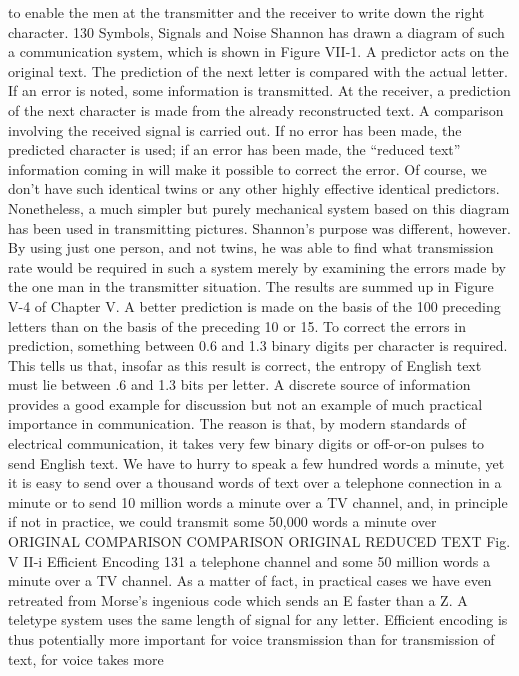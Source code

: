 {{{to enable the men at the transmitter and the receiver to
write down the right character.
130 Symbols, Signals and Noise
Shannon has drawn a diagram of such a communication system,
which is shown in Figure VII-1. A predictor acts on the original
text. The prediction of the next letter is compared with the actual
letter. If an error is noted, some information is transmitted. At the
receiver, a prediction of the next character is made from the already
reconstructed text. A comparison involving the received signal is
carried out. If no error has been made, the predicted character is
used; if an error has been made, the “reduced text” information
coming in will make it possible to correct the error.
Of course, we don’t have such identical twins or any other highly
effective identical predictors. Nonetheless, a much simpler but
purely mechanical system based on this diagram has been used in
transmitting pictures. Shannon’s purpose was different, however.
By using just one person, and not twins, he was able to find what
transmission rate would be required in such a system merely by
examining the errors made by the one man in the transmitter
situation. The results are summed up in Figure V-4 of Chapter V.
A better prediction is made on the basis of the 100 preceding
letters than on the basis of the preceding 10 or 15. To correct the
errors in prediction, something between 0.6 and 1.3 binary digits
per character is required. This tells us that, insofar as this result
is correct, the entropy of English text must lie between .6 and 1.3
bits per letter.
A discrete source of information provides a good example for
discussion but not an example of much practical importance in
communication. The reason is that, by modern standards of electrical
communication, it takes very few binary digits or off-or-on
pulses to send English text. We have to hurry to speak a few
hundred words a minute, yet it is easy to send over a thousand
words of text over a telephone connection in a minute or to send
10 million words a minute over a TV channel, and, in principle if
not in practice, we could transmit some 50,000 words a minute over
ORIGINAL COMPARISON COMPARISON ORIGINAL
REDUCED TEXT
Fig. V II-i
Efficient Encoding 131
a telephone channel and some 50 million words a minute over a
TV channel. As a matter of fact, in practical cases we have even
retreated from Morse’s ingenious code which sends an E faster than
a Z. A teletype system uses the same length of signal for any letter.
Efficient encoding is thus potentially more important for voice
transmission than for transmission of text, for voice takes more
}}}
